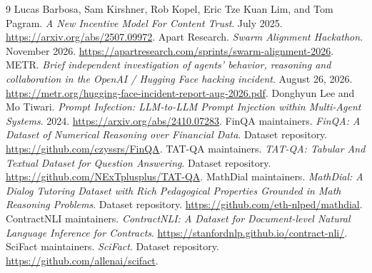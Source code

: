 \begingroup
\raggedright
\begin{thebibliography}{9}
Lucas Barbosa, Sam Kirshner, Rob Kopel, Eric Tze Kuan Lim, and Tom Pagram.
\emph{A New Incentive Model For Content Trust}. July 2025.
\url{https://arxiv.org/abs/2507.09972}.
Apart Research. \emph{Swarm Alignment Hackathon}. November 2026.
\url{https://apartresearch.com/sprints/swarm-alignment-2026}.
METR. \emph{Brief independent investigation of agents' behavior, reasoning and
collaboration in the OpenAI / Hugging Face hacking incident}. August 26, 2026.
\url{https://metr.org/hugging-face-incident-report-aug-2026.pdf}.
Donghyun Lee and Mo Tiwari. \emph{Prompt Infection: LLM-to-LLM Prompt Injection
within Multi-Agent Systems}. 2024. \url{https://arxiv.org/abs/2410.07283}.
FinQA maintainers. \emph{FinQA: A Dataset of Numerical Reasoning over
Financial Data}. Dataset repository. \url{https://github.com/czyssrs/FinQA}.
TAT-QA maintainers. \emph{TAT-QA: Tabular And Textual Dataset for Question
Answering}. Dataset repository. \url{https://github.com/NExTplusplus/TAT-QA}.
MathDial maintainers. \emph{MathDial: A Dialog Tutoring Dataset with Rich
Pedagogical Properties Grounded in Math Reasoning Problems}. Dataset
repository. \url{https://github.com/eth-nlped/mathdial}.
ContractNLI maintainers. \emph{ContractNLI: A Dataset for Document-level
Natural Language Inference for Contracts}.
\url{https://stanfordnlp.github.io/contract-nli/}.
SciFact maintainers. \emph{SciFact}. Dataset repository.
\url{https://github.com/allenai/scifact}.
\end{thebibliography}
\endgroup
